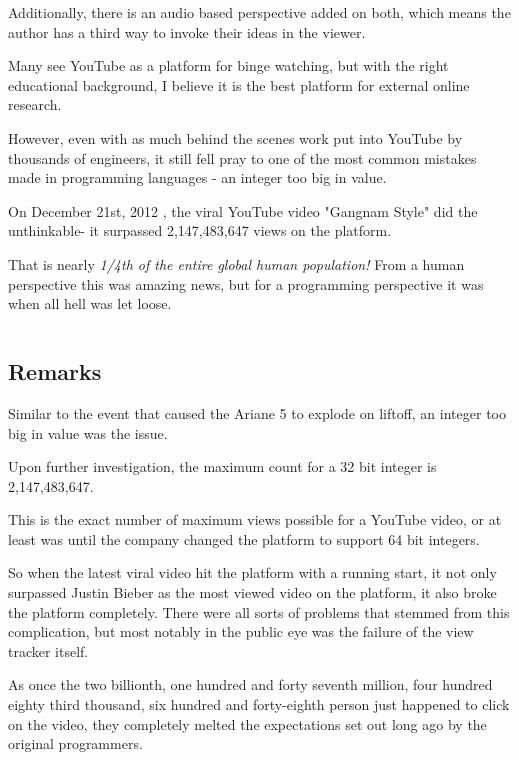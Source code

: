 \documentclass{article}
\begin{document}
\medskip\noindent
Additionally, there is an audio based perspective added on both, which means the author has a third way to invoke their ideas in the viewer.

\medskip\noindent
Many see YouTube as a platform for binge watching, but with the right educational background, I believe it is the best platform for external online research. 

\medskip\noindent
However, even with as much behind the scenes work put into YouTube by thousands of engineers, it still fell pray to one of the most common mistakes made in programming languages - an integer too big in value. 

\medskip\noindent
On December 21st, 2012 \cite{FB}, the viral YouTube video "Gangnam Style" did the unthinkable- it surpassed 2,147,483,647 views on the platform. 

\medskip\noindent
That is nearly \textit{1/4th of the entire global human population!} From a human perspective this was amazing news, but for a programming perspective it was when all hell was let loose. 

\medskip\medskip
\begin{lstlisting}
\end{lstlisting}

\medskip

\subsection{Remarks}
\medskip\medskip
\hspace{\parindent} 

Similar to the event that caused the Ariane 5 to explode on liftoff, an integer too big in value was the issue. 

\medskip\noindent
Upon further investigation, the maximum count for a 32 bit integer is 2,147,483,647.  

\medskip\noindent
This is the exact number of maximum views possible for a YouTube video, or at least was until the company changed the platform to support 64 bit integers.  

\medskip\noindent
So when the latest viral video hit the platform with a running start, it not only surpassed Justin Bieber as the most viewed video on the platform, it also broke the platform completely. 
\medskip\noindent
There were all sorts of problems that stemmed from this complication, but most notably in the public eye was the failure of the view tracker itself.  

\medskip\noindent
As once the two billionth, one hundred and forty seventh million, four hundred eighty third thousand, six hundred and forty-eighth person just happened to click on the video, they completely melted the expectations set out long ago by the original programmers. 
\end{document}
